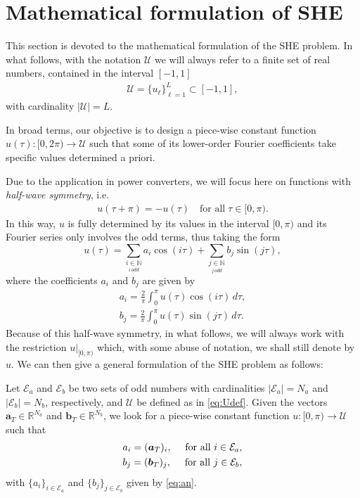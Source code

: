 \section{Mathematical formulation of SHE}\label{Section2}

This section is devoted to the mathematical formulation of the SHE problem. In what follows, with the notation $\mathcal U$ we will always refer to a finite set of real numbers, contained in the interval $[-1,1]$
\begin{align}\label{eq:Udef}
	\mathcal U = \{u_\ell\}_{\ell=1}^L\subset [-1,1],
\end{align}
with cardinality $|\mathcal U| = L$. 

In broad terms, our objective is to design a piece-wise constant function $u(\tau):[0,2\pi)\to\mathcal U$ such that some of its lower-order Fourier coefficients take specific values determined a priori. 

Due to the application in power converters, we will focus here on functions with \textit{half-wave symmetry}, i.e. 
\begin{align*}
	u(\tau + \pi) = -u(\tau)\quad \mbox{for all}\; \tau \in [0,\pi).
\end{align*}
In this way, $u$ is fully determined by its values in the interval $[0,\pi)$ and its Fourier series only involves the odd terms, thus taking the form
\begin{equation}
	u(\tau ) = \sum_{\underset{i\, odd}{i \in \mathbb{N}}} a_i \cos(i\tau)+ \sum_{\underset{j\, odd}{j \in \mathbb{N}}}  b_j \sin(j \tau), 
\end{equation}
where the coefficients $a_i$ and $b_j$ are given by
\begin{equation} \label{eq:an}
	\begin{aligned}
		a_i = \frac{2}{\pi} \int_0^\pi u(\tau ) \cos(i \tau)\,d\tau, 
		\\
		b_j = \frac{2}{\pi} \int_0^\pi u(\tau)  \sin(j \tau)\,d\tau.
	\end{aligned}
\end{equation}
Because of this half-wave symmetry, in what follows, we will always work with the restriction $u|_{[0,\pi)}$ which, with some abuse of notation, we shall still denote by $u$. We can then give a general formulation of the SHE problem as follows:
\newline
\begin{problem}[SHE]\label{SHEp}
Let $\mathcal{E} _a $ and $\mathcal{E} _b $ be two sets of odd numbers with cardinalities $|\mathcal{E}_a| = N_a $ and $ |\mathcal{E} _b| = N_b$, respectively, and $\mathcal{U}$ be defined as in \eqref{eq:Udef}. Given the vectors $\bm{a}_T \in \mathbb{R}^{N_a}$ and $\bm{b}_T \in \mathbb{R}^{N_b} $, we look for a piece-wise constant function $u: [0,\pi)\to\mathcal{U}$ such that 
\begin{gather}
	\notag a_i = (\bm{a}_T)_i, \quad\textrm{ for all } i \in \mathcal{E}_a,
	\\
	\notag b_j = (\bm {b}_T)_j, \quad\textrm{ for all } j \in \mathcal{E}_b,
\end{gather}
with $\{a_i\}_{i\in\mathcal E_a}$ and $\{b_j\}_{j\in\mathcal E_b}$ given by \eqref{eq:an}.
\end{problem} 
 
